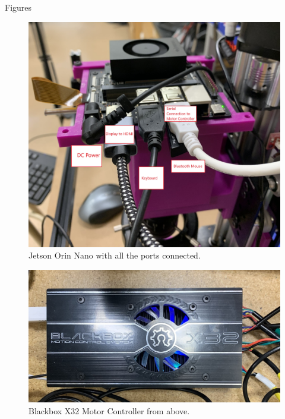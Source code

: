 \documentclass{article}
\begin{document}
\begin{outline}[enumerate]
\begin{enumerate}
    \end{enumerate}
\item Figures 
    \begin{figure}
        \includegraphics[width=\linewidth]{../content/jetson.jpg}
        \caption{Jetson Orin Nano with all the ports connected.}
        \label{fig:jetson1}
    \end{figure}

    \begin{figure}
        \includegraphics[width=\linewidth]{../content/motor_controller.jpg}
        \caption{Blackbox X32 Motor Controller from above.}
        \label{fig:controller1}
    \end{figure}


\end{outline}
\end{document}
